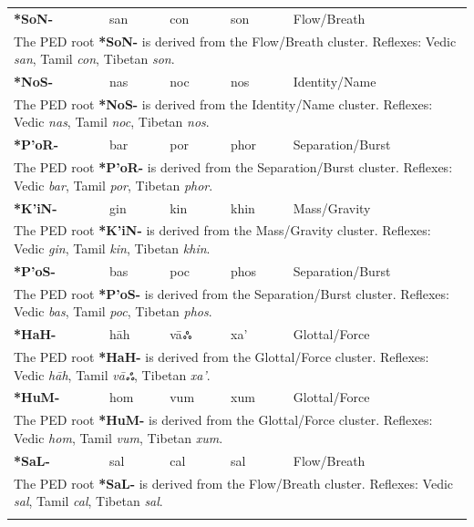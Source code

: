 \begin{longtable}{p{} p{} p{} p{} p{}}
\textbf{*SoN-} & san & con & son & Flow/Breath \\ 
\multicolumn{5}{p{\textwidth}}{\small The PED root \textbf{*SoN-} is derived from the Flow/Breath cluster. Reflexes: Vedic \textit{san}, Tamil \textit{con}, Tibetan \textit{son}. } \\ \addlinespace 
\textbf{*NoS-} & nas & noc & nos & Identity/Name \\ 
\multicolumn{5}{p{\textwidth}}{\small The PED root \textbf{*NoS-} is derived from the Identity/Name cluster. Reflexes: Vedic \textit{nas}, Tamil \textit{noc}, Tibetan \textit{nos}. } \\ \addlinespace 
\textbf{*P'oR-} & bar & por & phor & Separation/Burst \\ 
\multicolumn{5}{p{\textwidth}}{\small The PED root \textbf{*P'oR-} is derived from the Separation/Burst cluster. Reflexes: Vedic \textit{bar}, Tamil \textit{por}, Tibetan \textit{phor}. } \\ \addlinespace 
\textbf{*K'iN-} & gin & kin & khin & Mass/Gravity \\ 
\multicolumn{5}{p{\textwidth}}{\small The PED root \textbf{*K'iN-} is derived from the Mass/Gravity cluster. Reflexes: Vedic \textit{gin}, Tamil \textit{kin}, Tibetan \textit{khin}. } \\ \addlinespace 
\textbf{*P'oS-} & bas & poc & phos & Separation/Burst \\ 
\multicolumn{5}{p{\textwidth}}{\small The PED root \textbf{*P'oS-} is derived from the Separation/Burst cluster. Reflexes: Vedic \textit{bas}, Tamil \textit{poc}, Tibetan \textit{phos}. } \\ \addlinespace 
\textbf{*HaH-} & hāh & vāஃ & xa' & Glottal/Force \\ 
\multicolumn{5}{p{\textwidth}}{\small The PED root \textbf{*HaH-} is derived from the Glottal/Force cluster. Reflexes: Vedic \textit{hāh}, Tamil \textit{vāஃ}, Tibetan \textit{xa'}. } \\ \addlinespace 
\textbf{*HuM-} & hom & vum & xum & Glottal/Force \\ 
\multicolumn{5}{p{\textwidth}}{\small The PED root \textbf{*HuM-} is derived from the Glottal/Force cluster. Reflexes: Vedic \textit{hom}, Tamil \textit{vum}, Tibetan \textit{xum}. } \\ \addlinespace 
\textbf{*SaL-} & sal & cal & sal & Flow/Breath \\ 
\multicolumn{5}{p{\textwidth}}{\small The PED root \textbf{*SaL-} is derived from the Flow/Breath cluster. Reflexes: Vedic \textit{sal}, Tamil \textit{cal}, Tibetan \textit{sal}. } \\ \addlinespace 

\end{longtable}
